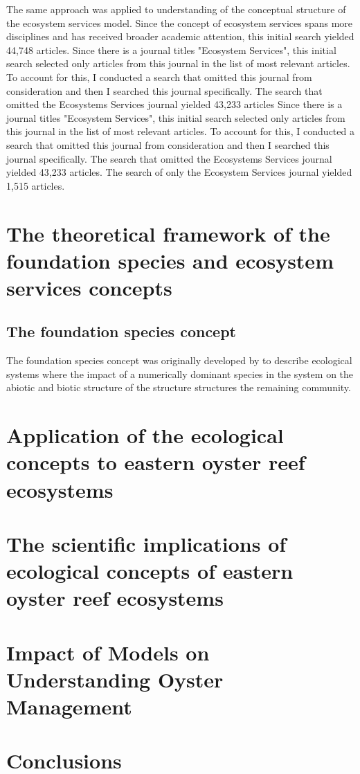 \documentclass{article}
\begin{document}
The same approach was applied to understanding of the conceptual structure of the ecosystem services model. Since the concept of ecosystem services spans more disciplines and has received broader academic attention, this initial search yielded 44,748 articles. Since there is a journal titles "Ecosystem Services", this initial search selected only articles from this journal in the list of most relevant articles. To account for this, I conducted a search that omitted this journal from consideration and then I searched this journal specifically. The search that omitted the Ecosystems Services journal yielded 43,233 articles Since there is a journal titles "Ecosystem Services", this initial search selected only articles from this journal in the list of most relevant articles. To account for this, I conducted a search that omitted this journal from consideration and then I searched this journal specifically. The search that omitted the Ecosystems Services journal yielded 43,233 articles. The search of only the Ecosystem Services journal yielded 1,515 articles.  

\section*{The theoretical framework of the foundation species and ecosystem services concepts}
\label{sec:theoretical_framework}

\subsection{The foundation species concept}
\label{subsec:foundation_species}

The foundation species concept was originally developed by  to describe ecological systems where the impact of a numerically dominant species in the system on the abiotic and biotic structure of the structure structures the remaining community.

\section*{Application of the ecological concepts to eastern oyster reef ecosystems}
\label{sec:concept_application}

\section*{The scientific implications of ecological concepts of eastern oyster reef ecosystems}
\label{sec:scientific_implications}

\section*{Impact of Models on Understanding Oyster Management}
\label{sec:impact_of_models}

\section*{Conclusions}
\label{sec:conclusions}



\end{document}
